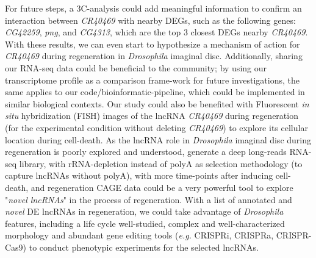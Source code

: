 For future steps, a 3C-analysis could add meaningful information to confirm an interaction between \textit{CR40469} with nearby DEGs, such as the following genes: \textit{CG42259}, \textit{png}, and \textit{CG4313}, which are the top 3 closest DEGs nearby \textit{CR40469}. With these results, we can even start to hypothesize a mechanism of action for \textit{CR40469} during regeneration in \textit{Drosophila} imaginal disc. Additionally, sharing our RNA-seq data could be beneficial to the community; by using our transcriptome profile as a comparison frame-work for future investigations, the same applies to our code/bioinformatic-pipeline, which could be implemented in similar biological contexts. Our study could also be benefited with Fluorescent \textit{in situ} hybridization (FISH) images of the lncRNA \textit{CR40469} during regeneration (for the experimental condition without deleting \textit{CR40469}) to explore its cellular location during cell-death. As the lncRNA role in \textit{Drosophila} imaginal disc during regeneration is poorly explored and understood, generate a deep long-reads RNA-seq library, with rRNA-depletion instead of polyA as selection methodology (to capture lncRNAs without polyA), with more time-points after inducing cell-death, and regeneration CAGE data could be a very powerful tool to explore "\textit{novel lncRNAs}"  in the process of regeneration. With a list of annotated and \textit{novel} DE lncRNAs in regeneration, we could take advantage of \textit{Drosophila} features, including a life cycle well-studied, complex and well-characterized morphology and abundant gene editing tools (\textit{e.g.} CRISPRi, CRISPRa, CRISPR-Cas9) to conduct phenotypic experiments for the selected lncRNAs. 


